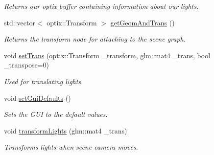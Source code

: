 \begin{DoxyCompactItemize}
\begin{DoxyCompactList}\small\item\em Returns our optix buffer containing information about our lights. \end{DoxyCompactList}\item 
\hypertarget{class_light_manager_a1c67bccf06073356ab849c42a6cc9c36}{std\-::vector$<$ optix\-::\-Transform $>$ \hyperlink{class_light_manager_a1c67bccf06073356ab849c42a6cc9c36}{get\-Geom\-And\-Trans} ()}\label{class_light_manager_a1c67bccf06073356ab849c42a6cc9c36}

\begin{DoxyCompactList}\small\item\em Returns the transform node for attaching to the scene graph. \end{DoxyCompactList}\item 
\hypertarget{class_light_manager_ae22469b57f40bd5b7d21ac6d857f8ce6}{void \hyperlink{class_light_manager_ae22469b57f40bd5b7d21ac6d857f8ce6}{set\-Trans} (optix\-::\-Transform \-\_\-transform, glm\-::mat4 \-\_\-trans, bool \-\_\-transpose=0)}\label{class_light_manager_ae22469b57f40bd5b7d21ac6d857f8ce6}

\begin{DoxyCompactList}\small\item\em Used for translating lights. \end{DoxyCompactList}\item 
\hypertarget{class_light_manager_acef6714d411c825fc6599a1c892fc9ff}{void \hyperlink{class_light_manager_acef6714d411c825fc6599a1c892fc9ff}{set\-Gui\-Defaults} ()}\label{class_light_manager_acef6714d411c825fc6599a1c892fc9ff}

\begin{DoxyCompactList}\small\item\em Sets the G\-U\-I to the default values. \end{DoxyCompactList}\item 
\hypertarget{class_light_manager_a50a3c0743afffc6db604e5eb325968c2}{void \hyperlink{class_light_manager_a50a3c0743afffc6db604e5eb325968c2}{transform\-Lights} (glm\-::mat4 \-\_\-trans)}\label{class_light_manager_a50a3c0743afffc6db604e5eb325968c2}

\begin{DoxyCompactList}\small\item\em Transforms lights when scene camera moves. \end{DoxyCompactList}\end{DoxyCompactItemize}
